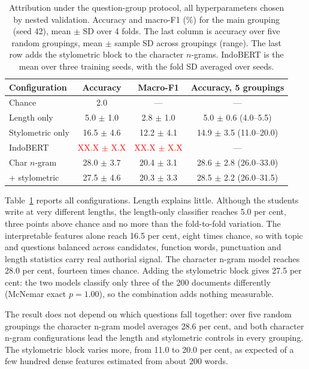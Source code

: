 \documentclass[conference]{IEEEtran}
\newcommand{\tbd}[1]{\textcolor{red}{#1}}
\begin{document}
\begin{table}[!t]
\caption{Attribution under the question-group protocol, all hyperparameters chosen by nested validation. Accuracy and macro-F1 (\%) for the main grouping (seed 42), mean $\pm$ SD over 4 folds. The last column is accuracy over five random groupings, mean $\pm$ sample SD across groupings (range). The last row adds the stylometric block to the character $n$-grams. IndoBERT is the mean over three training seeds, with the fold SD averaged over seeds.}
\label{tab:main}
\centering
\footnotesize
\setlength{\tabcolsep}{3pt}
\begin{tabular}{@{}lccc@{}}
\hline
Configuration & Accuracy & Macro-F1 & Accuracy, 5 groupings \\
\hline
Chance             & 2.0 & --- & --- \\
Length only        & 5.0 $\pm$ 1.0 & 2.8 $\pm$ 1.0 & 5.0 $\pm$ 0.6 (4.0--5.5) \\
Stylometric only   & 16.5 $\pm$ 4.6 & 12.2 $\pm$ 4.1 & 14.9 $\pm$ 3.5 (11.0--20.0) \\
IndoBERT           & \tbd{XX.X $\pm$ X.X} & \tbd{XX.X $\pm$ X.X} & --- \\
Char $n$-gram      & 28.0 $\pm$ 3.7 & 20.4 $\pm$ 3.1 & 28.6 $\pm$ 2.8 (26.0--33.0) \\
\quad + stylometric & 27.5 $\pm$ 4.6 & 20.3 $\pm$ 3.3 & 28.5 $\pm$ 2.2 (26.0--31.5) \\
\hline
\end{tabular}
\end{table}

Table~\ref{tab:main} reports all configurations. Length explains little. Although the students write at very different lengths, the length-only classifier reaches 5.0 per cent, three points above chance and no more than the fold-to-fold variation. The interpretable features alone reach 16.5 per cent, eight times chance, so with topic and questions balanced across candidates, function words, punctuation and length statistics carry real authorial signal. The character n-gram model reaches 28.0 per cent, fourteen times chance. Adding the stylometric block gives 27.5 per cent: the two models classify only three of the 200 documents differently (McNemar exact $p = 1.00$), so the combination adds nothing measurable.

The result does not depend on which questions fall together: over five random groupings the character n-gram model averages 28.6 per cent, and both character n-gram configurations lead the length and stylometric controls in every grouping. The stylometric block varies more, from 11.0 to 20.0 per cent, as expected of a few hundred dense features estimated from about 200 words.
\end{document}
